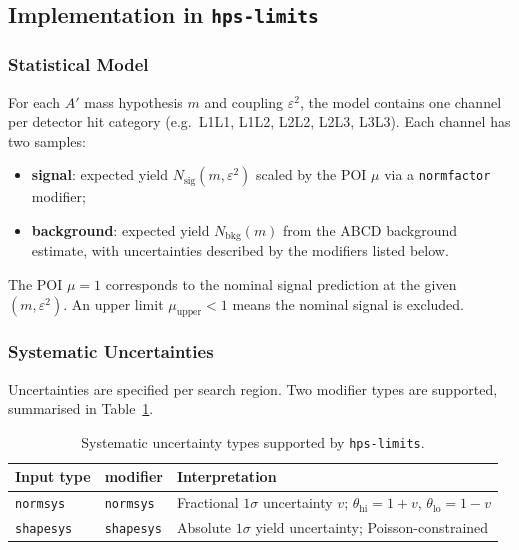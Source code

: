 \subsection{Implementation in \texttt{hps-limits}}

\subsubsection{Statistical Model}

For each $A'$ mass hypothesis $m$ and coupling $\varepsilon^2$, the model
contains one \pyhf{} channel per detector hit category (e.g.\ L1L1, L1L2,
L2L2, L2L3, L3L3).  Each channel has two samples:
%
\begin{itemize}
  \item \textbf{signal}: expected yield $N_\text{sig}(m,\varepsilon^2)$
    scaled by the POI $\mu$ via a \texttt{normfactor} modifier;
  \item \textbf{background}: expected yield $N_\text{bkg}(m)$ from the ABCD
    background estimate, with uncertainties described by the modifiers listed
    below.
\end{itemize}
%
The POI $\mu = 1$ corresponds to the nominal signal prediction at the given
$(m, \varepsilon^2)$.  An upper limit $\mu_\text{upper} < 1$ means the
nominal signal is excluded.

\subsubsection{Systematic Uncertainties}

Uncertainties are specified per search region.  Two modifier types are
supported, summarised in Table~\ref{tab:modifiers}.

\begin{table}[h]
  \centering
  \caption{Systematic uncertainty types supported by \texttt{hps-limits}.}
  \label{tab:modifiers}
  \begin{tabular}{lll}
    \hline
    Input type  & \pyhf{} modifier & Interpretation \\
    \hline
    \texttt{normsys}  & \texttt{normsys}  &
      Fractional $1\sigma$ uncertainty $v$;
      $\theta_\text{hi} = 1+v$, $\theta_\text{lo} = 1-v$ \\
    \texttt{shapesys} & \texttt{shapesys} &
      Absolute $1\sigma$ yield uncertainty; Poisson-constrained \\
    \hline
  \end{tabular}
\end{table}

